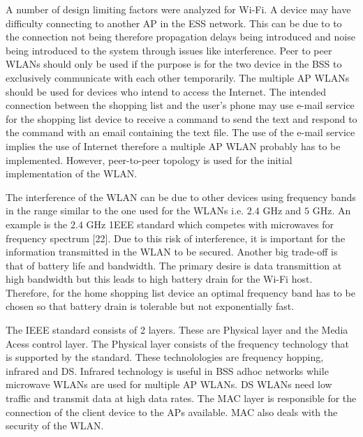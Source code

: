 A number of design limiting factors were analyzed for Wi-Fi. A device may have difficulty connecting to another AP in the ESS network. This can be due to to the connection not being therefore propagation delays being introduced and noise being introduced to the system through issues like interference. Peer to peer WLANs should only be used if the purpose is for the two device in the BSS to exclusively communicate with each other temporarily. The multiple AP WLANs should be used for devices who intend to access the Internet. The intended connection between the shopping list and the user's phone may use e-mail service for the shopping list device to receive a command to send the text and respond to the command with an email containing the text file. The use of the e-mail service implies the use of Internet therefore a multiple AP WLAN probably has to be implemented. However, peer-to-peer topology is used for the initial implementation of the WLAN. 

The interference of the WLAN can be due to other devices using frequency bands in the range similar to the one used for the WLANs i.e. $2.4$ GHz and $5$ GHz.  An example is the $2.4$ GHz 1EEE standard which competes with microwaves for frequency spectrum [22]. Due to this risk of interference, it is important for the information transmitted in the WLAN to be secured. Another big trade-off is that of battery life and bandwidth. The primary desire is data transmittion at high bandwidth but this leads to high battery drain for the Wi-Fi host. Therefore, for the home shopping list device an optimal frequency band has to be chosen so that battery drain is tolerable but not exponentially fast.  

The IEEE standard consists of 2 layers. These are Physical layer and the Media Acess control layer. The Physical layer consists of the frequency technology that is supported by the standard. These technolologies are frequency hopping, infrared and DS. Infrared technology is useful in BSS adhoc networks while microwave WLANs are used for multiple AP WLANs. DS WLANs need low traffic and transmit data at high data rates. The MAC layer is responsible for  the connection of the client device to the APs available. MAC also deals with the security of the WLAN.

